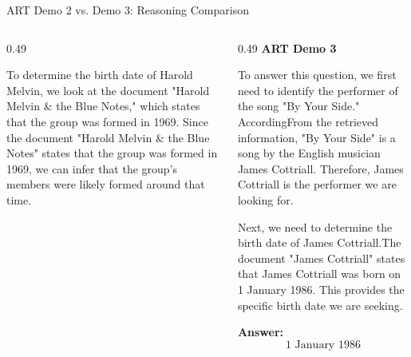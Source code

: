 \begin{frame}{ART Demo 2 vs. Demo 3: Reasoning Comparison}
\begin{columns}[T,onlytextwidth]
\begin{column}{0.49\textwidth}
\begin{block}{}
            To determine the birth date of Harold Melvin, we look at the document "Harold Melvin \& the Blue Notes," which states that the group was formed in 1969. Since the document "Harold Melvin \& the Blue Notes" states that the group was formed in 1969, we can infer that the group's members were likely formed around that time.
        \end{block}
    \end{column}

    \begin{column}{0.49\textwidth}
        \centering
        \textbf{ART Demo 3}
        \vspace{0.08cm}

        \begin{block}{}
            \tiny
            To answer this question, we first need to identify the performer of the song "By Your Side." AccordingFrom the retrieved information, "By Your Side" is a song by the English musician James Cottriall. Therefore, James Cottriall is the performer we are looking for.

            Next, we need to determine the birth date of James Cottriall.The document "James Cottriall" states that James Cottriall was born on 1 January 1986. This provides the specific birth date we are seeking.

            \vspace{0.1cm}
            \textbf{Answer:}
            \[
                \boxed{\text{1 January 1986}}
            \]
        \end{block}
    \end{column}

\end{columns}

\end{frame}
